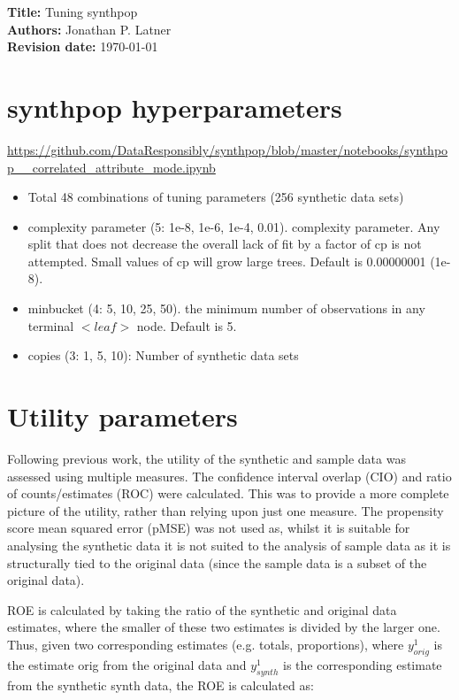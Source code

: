 \documentclass[12pt]{article}
\begin{document}
{\bf Title:} Tuning synthpop \\
{\bf Authors:} Jonathan P. Latner \\
{\bf Revision date:} \today

\section{synthpop hyperparameters}

\url{https://github.com/DataResponsibly/synthpop/blob/master/notebooks/synthpop__correlated_attribute_mode.ipynb}


\begin{itemize}
    \item Total 48 combinations of tuning parameters (256 synthetic data sets)
    \item complexity parameter (5: 1e-8, 1e-6, 1e-4, 0.01).  complexity parameter. Any split that does not decrease the overall lack of fit by a factor of cp is not attempted. Small values of cp will grow large trees.  Default is 0.00000001 (1e-8).
    \item minbucket (4: 5, 10, 25, 50). the minimum number of observations in any terminal $<leaf>$ node. Default is 5.  
    \item copies (3: 1, 5, 10): Number of synthetic data sets
\end{itemize}

\section{Utility parameters}

Following previous work, the utility of the synthetic and sample data was assessed using multiple measures. The confidence interval overlap (CIO) and ratio of counts/estimates (ROC) were calculated. This was to provide a more complete picture of the utility, rather than relying upon just one measure. The propensity score mean squared error (pMSE) was not used as, whilst it is suitable for analysing the synthetic data it is not suited to the analysis of sample data as it is structurally tied to the original data (since the sample data is a subset of the original data).

ROE is calculated by taking the ratio of the synthetic and original data estimates, where the smaller of these two estimates is divided by the larger one. Thus, given two corresponding estimates (e.g. totals, proportions), where $y^1_{orig}$ is the estimate orig from the original data and $y^1_{synth}$ is the corresponding estimate from the synthetic synth data, the ROE is calculated as:
\end{document}

